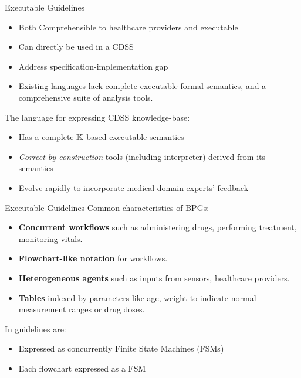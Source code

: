 \documentclass{beamer}
\begin{document}
\begin{frame}{Executable Guidelines}
  \begin{itemize}
    \item Both \alert{Comprehensible} to healthcare providers and \alert{executable}
    \item Can directly be used in a CDSS
    \item Address \alert{specification-implementation gap}
      \pause
    \item Existing languages lack complete executable formal semantics,
      and a comprehensive suite of analysis tools.
  \end{itemize}
  \pause
  The \MediK{} language for expressing CDSS knowledge-base:
  \begin{itemize}
    \item Has a complete $\mathbb{K}$-based executable semantics
    \item \emph{Correct-by-construction} tools (including interpreter)
      derived from its semantics
    \item Evolve rapidly to incorporate medical domain experts' feedback

  \end{itemize}
\end{frame}

\begin{frame}{Executable Guidelines}
  Common characteristics of BPGs:
  \begin{itemize}
    \item \textbf{Concurrent workflows} such as administering
      drugs, performing treatment, monitoring vitals.
    \item \textbf{Flowchart-like notation} for workflows.
    \item \textbf{Heterogeneous agents} such as inputs from sensors, healthcare
      providers.
    \item \textbf{Tables} indexed by parameters like age, weight to indicate
      normal measurement ranges or drug doses.
  \end{itemize}
  \pause
  In \MediK{} guidelines are:
  \begin{itemize}
    \item Expressed as concurrently Finite State Machines (FSMs)
    \item Each flowchart expressed as a FSM
  \end{itemize}
\end{frame}
\end{document}
